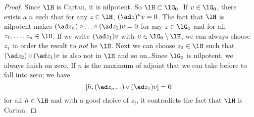 \begin{proof}
Since $\lH$ is Cartan, it is nilpotent. So $\lH\subset\lG_0$. If $v\in\lG_0$, there exists a $n$ such that for any $z\in\lH$, $(\ad z)^nv=0$. The fact that $\lH$ is nilpotent makes $(\ad z_n)\circ\ldots\circ(\ad z_1)v=0$ for any $z\in\lG_0$ and for all $z_1,\ldots,z_n\in\lH$. If we write $(\ad z_1)v$ with $v\in\lG_0\setminus\lH$, we can always choose $z_1$ in order the result to \emph{not} be $\lH$. Next we can choose $z_2\in\lH$ such that $(\ad z_2)\circ(\ad z_1)v$ is also not in $\lH$ and so on\ldots Since $\lG_0$ is nilpotent, we always finish on zero. If $n$ is the maximum of adjoint that we can take before to fall into zero; we have
\[
[h, (\ad z_{n-1})\circ(\ad z_1)v ]=0
\]
for all $h\in\lH$ and with a good choice of $z_i$, it contradicts the fact that $\lH$ is Cartan.
\end{proof}
